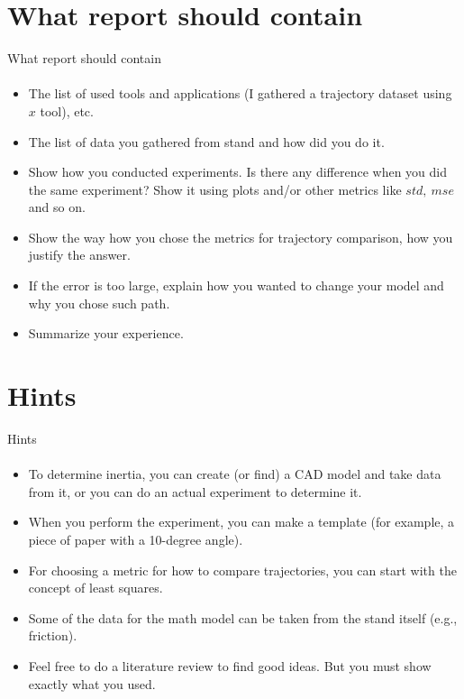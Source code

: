 \documentclass[aspectratio=169]{beamer}
\newcommand{\fbckg}[1]{\usebackgroundtemplate{\texttt{[image: \#1]}}}%
\begin{document}
\section{What report should contain}
\begin{frame}[t]{What report should contain}
\framesubtitle{}
\vspace{-0.4cm}
\begin{itemize}
  \item The list of used tools and applications (I gathered a trajectory dataset using $x$ tool), etc.
  \item The list of data you gathered from stand and how did you do it.
  \item Show how you conducted experiments. Is there any difference when you did the same experiment? Show it using plots and/or other metrics like $std,\ mse$ and so on.
  \item Show the way how you chose the metrics for trajectory comparison, how you justify the answer.
  \item If the error is too large, explain how you wanted to change your model and why you chose such path.
  \item Summarize your experience.
\end{itemize}
\end{frame}

\section{Hints}
\begin{frame}[t]{Hints}
\framesubtitle{}
\vspace{-0.4cm}
  \begin{itemize}
    \item To determine inertia, you can create (or find) a CAD model and take data from it, or you can do an actual experiment to determine it.
    \item When you perform the experiment, you can make a template (for example, a piece of paper with a 10-degree angle).
    \item For choosing a metric for how to compare trajectories, you can start with the concept of least squares.
    \item Some of the data for the math model can be taken from the stand itself (e.g., friction).
    \item Feel free to do a literature review to find good ideas. But you must show exactly what you used.
  \end{itemize}
\end{frame}

\fbckg{fibeamer/figs/last_page.png}
\frame[plain]{}
\end{document}
